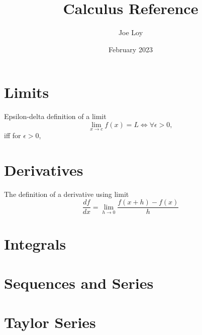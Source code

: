\documentclass{article}
\title{Calculus Reference}
\author{Joe Loy}
\date{February 2023}
\begin{document}
\maketitle

\section{Limits}

Epsilon-delta definition of a limit 
$$\lim_{x \rightarrow c}f(x) = L \Leftrightarrow \forall \epsilon > 0, $$
iff for $\epsilon > 0$, 

\section{Derivatives}

The definition of a derivative using limit
$$\frac{df}{dx} = \lim_{h \rightarrow 0} \frac{f(x + h) - f(x)}{h}$$

\section{Integrals}

\section{Sequences and Series}

\section{Taylor Series}
\end{document}
